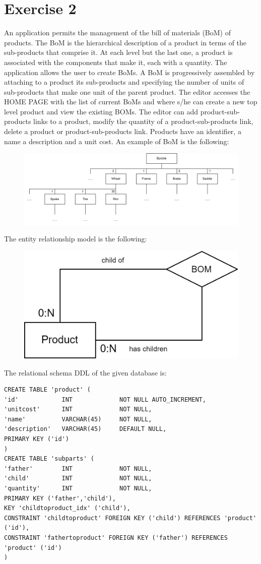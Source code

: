 \section{Exercise 2}

An application permits the management of the bill of materials (BoM) of products. 
The BoM is the hierarchical description of a product in terms of the sub-products that comprise it. 
At each level but the last one, a product is associated with the components that make it, each with a quantity. 
The application allows the user to create BoMs.
A BoM is progressively assembled by attaching to a product its sub-products and specifying the number of units of sub-products that make one unit of the parent product. 
The editor accesses the HOME PAGE with the list of current BoMs and where s/he can create a new top level product and view the existing BOMs. 
The editor can add product-sub-products links to a product, modify the quantity of a product-sub-products link, delete a product or product-sub-products link. 
Products have an identifier, a name a description and a unit cost. 
An example of BoM is the following: 
\begin{figure}[H]
    \centering
    \includegraphics[width=1.0\linewidth]{images/BoM.png}
\end{figure}
The entity relationship model is the following:
\begin{figure}[H]
    \centering
    \includegraphics[width=0.5\linewidth]{images/e-r1.png}
\end{figure}
The relational schema DDL of the given database is: 
\begin{lstlisting}[style=SQL]
CREATE TABLE 'product' (
'id'            INT             NOT NULL AUTO_INCREMENT,
'unitcost'      INT             NOT NULL,
'name'          VARCHAR(45)     NOT NULL,
'description'   VARCHAR(45)     DEFAULT NULL,
PRIMARY KEY ('id')
) 
CREATE TABLE 'subparts' (
'father'        INT             NOT NULL,
'child'         INT             NOT NULL,
'quantity'      INT             NOT NULL,
PRIMARY KEY ('father','child'),
KEY 'childtoproduct_idx' ('child'),
CONSTRAINT 'childtoproduct' FOREIGN KEY ('child') REFERENCES 'product' ('id'),
CONSTRAINT 'fathertoproduct' FOREIGN KEY ('father') REFERENCES 'product' ('id')
)           
\end{lstlisting}
